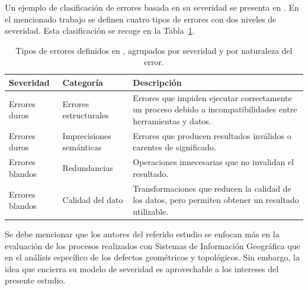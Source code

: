 Un ejemplo de clasificación de errores basada en su severidad se presenta en \cite{kruiger_loose_2021}. En el mencionado trabajo se definen cuatro tipos de errores con dos niveles de severidad. Esta clasificación se recoge en la Tabla~\ref{tab:kruiger_errores}.

\begin{table}[H]
	\centering
	\caption{Tipos de errores definidos en \cite{kruiger_loose_2021}, agrupados por severidad y por naturaleza del error.}
	\label{tab:kruiger_errores}
	\begin{tabularx}{\textwidth}{@{}l l X@{}}
		\toprule
		\textbf{Severidad} & \textbf{Categoría}       & \textbf{Descripción}                                                                                          \\
		\midrule
		Errores duros      & Errores estructurales    & Errores que impiden ejecutar correctamente un proceso debido a incompatibilidades entre herramientas y datos. \\
		Errores duros      & Imprecisiones semánticas & Errores que producen resultados inválidos o carentes de significado.                                          \\
		Errores blandos    & Redundancias             & Operaciones innecesarias que no invalidan el resultado.                                                       \\
		Errores blandos    & Calidad del dato         & Transformaciones que reducen la calidad de los datos, pero permiten obtener un resultado utilizable.          \\
		\bottomrule
	\end{tabularx}
\end{table}

Se debe mencionar que los autores del referido estudio se enfocan más en la evaluación de los procesos realizados con Sistemas de Información Geográfica que en el análisis específico de los defectos geométricos y topológicos. Sin embargo, la idea que encierra su modelo de severidad es aprovechable a los intereses del presente estudio.

